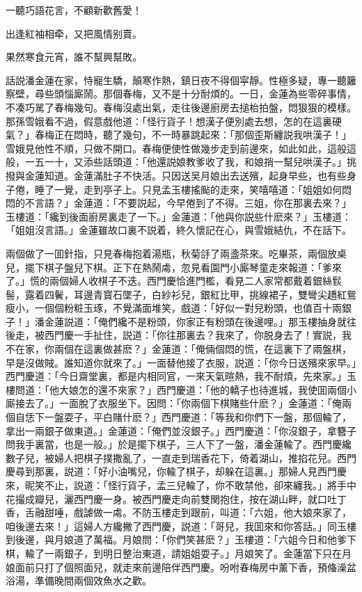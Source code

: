 一聽巧語花言，不顧新歡舊愛！

出逢紅袖相牵，又把風情别賣。

果然寒食元宵，誰不幫興幫敗。

話説潘金蓮在家，恃寵生驕，顛寒作熱，鎮日夜不得個寜靜。性極多疑，專一聽籬察壁，尋些頭惱廝鬧。那個春梅，又不是十分耐煩的。一日，金蓮為些零碎事情，不凑巧駡了春梅幾句。春梅沒處出氣，走往後邊廚房去搥枱拍盤，悶狠狠的模樣。那孫雪娥看不過，假意戲他道：「怪行貨子！想漢子便別處去想，怎的在這裏硬氣？」春梅正在悶時，聽了幾句，不一時暴跳起來：「那個歪斯纏説我哄漢子！」雪娥見他性不順，只做不開口。春梅便使性做幾步走到前邊來，如此如此，這般這般，一五一十，又添些話頭道：「他還説娘教爹收了我，和娘捎一幫兒哄漢子。」挑撥與金蓮知道。金蓮滿肚子不快活。只因送吴月娘出去送殯，起身早些，也有些身子倦，睡了一覺，走到亭子上。只見孟玉樓搖颭的走來，笑嘻嘻道：「姐姐如何悶悶的不言語？」金蓮道：「不要説起，今早倦到了不得。三姐，你在那裏去來？」玉樓道：「纔到後面廚房裏走了一下。」金蓮道：「他與你説些什麽來？」玉樓道：「姐姐沒言語。」金蓮雖故口裏不説着，終久懷記在心，與雪娥結仇，不在話下。

兩個做了一囬針指，只見春梅抱着湯瓶，秋菊㧱了兩盞茶來。吃畢茶，兩個放桌兒，擺下棋子盤兒下棋。正下在熱鬧䖏，忽見看園門小廝琴童走來報道：「爹來了。」慌的兩個婦人收棋子不迭。西門慶恰進門檻，看見二人家常都戴着銀絲䯼髻，露着四鬢，耳邊青寳石墜子，白紗衫兒，銀紅比甲，挑線裙子，雙彎尖趫紅鴛瘦小，一個個粉粧玉琢，不覺滿面堆笑，戲道：「好似一對兒粉頭，也值百十兩銀子！」潘金蓮説道：「俺們纔不是粉頭，你家正有粉頭在後邊哩。」那玉樓抽身就往後走，被西門慶一手扯住，説道：「你往那裏去？我來了，你脱身去了！實説，我不在家，你兩個在這裏做甚麽？」金蓮道：「俺倆個悶的慌，在這裏下了兩盤棋，早是沒做賊。誰知道你就來了。」一面替他接了衣服，説道：「你今日送殯來家早。」西門慶道：「今日齋堂裏，都是内相同官，一來天氣暄熱，我不耐煩，先來家。」玉樓問道：「他大娘怎的還不來家？」西門慶道：「他的轎子也待進城，我使囬兩個小廝接去了。」一面脫了衣服坐下。因問：「你兩個下棋賭些什麽？」金蓮道：「俺兩個自恁下一盤耍子，平白賭什麽？」西門慶道：「等我和你們下一盤，那個輸了，拿出一兩銀子做東道。」金蓮道：「俺們並沒銀子。」西門慶道：「你沒銀子，拿簪子問我手裏當，也是一般。」於是擺下棋子，三人下了一盤，潘金蓮輸了。西門慶纔數子兒，被婦人把棋子撲撒亂了，一直走到瑞香花下，倚着湖山，推掐花兒。西門慶尋到那裏，説道：「好小油嘴兒，你輸了棋子，却躲在這裏。」那婦人見西門慶來，昵笑不止，説道：「怪行貨子，孟三兒輸了，你不敢禁他，卻來纏我。」將手中花撮成瓣兒，灑西門慶一身。被西門慶走向前雙関抱住，按在湖山畔，就口吐丁香，舌融甜唾，戲謔做一䖏。不防玉樓走到跟前，叫道：「六姐，他大娘來家了，咱後邊去來！」這婦人方纔撇了西門慶，説道：「哥兒，我囬來和你答話。」同玉樓到後邊，與月娘道了萬福。月娘問：「你們笑甚麽？」玉樓道：「六姐今日和他爹下棋，輸了一兩銀子，到明日整治東道，請姐姐耍子。」月娘笑了。金蓮當下只在月娘面前只打了個照面兒，就走來前邊陪伴西門慶。吩咐春梅房中薰下香，預偹澡盆浴湯，準備晚間兩個效魚水之歡。

